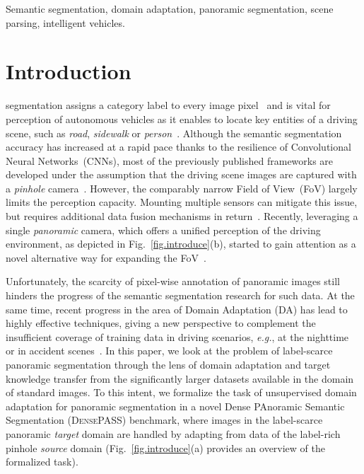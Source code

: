 \documentclass[journal]{IEEEtran}
\begin{document}
\begin{IEEEkeywords}
Semantic segmentation, domain adaptation, panoramic segmentation, scene parsing, intelligent vehicles.
\end{IEEEkeywords}

\IEEEpeerreviewmaketitle

\section{Introduction}
 segmentation assigns a category label to every image pixel~\cite{fcn} and is vital for perception of autonomous vehicles as it enables to locate key entities of a driving scene, such as \emph{road}, \emph{sidewalk} or \emph{person}~\cite{peng2021mass}. 
Although the semantic segmentation accuracy has increased at a rapid pace thanks to the resilience of Convolutional Neural Networks~(CNNs),
most of the previously published frameworks are developed under the assumption that the driving scene images are captured with a \emph{pinhole} camera~\cite{cityscapes}.
However, the comparably narrow Field of View~(FoV) largely limits the perception capacity.
Mounting multiple sensors can mitigate this issue, but requires additional data fusion mechanisms in return~\cite{restricted,camera_lidar}.
Recently, leveraging a single \emph{panoramic} camera, which offers a unified  perception of the driving environment, as depicted in Fig.~\ref{fig.introduce}(b), started to gain attention as a novel alternative way for expanding the FoV~\cite{can_we_pass,pass}.

Unfortunately, the scarcity of pixel-wise annotation of panoramic images still hinders the progress of the semantic segmentation research for such data.
At the same time, recent progress in the area of Domain Adaptation (DA) has lead to highly effective techniques, giving a new perspective to complement the insufficient coverage of training data in driving scenarios, \textit{e.g.}, at the nighttime~\cite{bridging} or in accident scenes~\cite{issafe}.
In this paper, we look at the problem of label-scarce panoramic segmentation through the lens of domain adaptation and target knowledge transfer from the significantly larger datasets available in the domain of standard images. 
To this intent, we formalize the task of unsupervised domain adaptation for panoramic segmentation in a novel Dense PAnoramic Semantic Segmentation (\textsc{DensePASS}) benchmark, where images in the label-scarce panoramic \emph{target} domain are handled by adapting from data of the label-rich pinhole \emph{source} domain (Fig.~\ref{fig.introduce}(a) provides an overview of the formalized task). 
\end{document}
